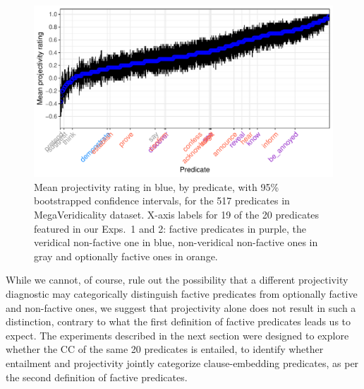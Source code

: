\documentclass[11pt,fleqn]{article}
\newcommand{\6}{\mbox{$[\hspace*{-.6mm}[$}}
\newcommand{\9}{\mbox{$]\hspace*{-.6mm}]$}}
\begin{document}
\begin{figure}[H]
\centering
\includegraphics[width=.75\paperwidth]{../white-rawlins-data/graphs/means-projection-by-predicate}

\caption{Mean projectivity rating in blue, by predicate, with 95\% bootstrapped confidence intervals, for the 517 predicates in MegaVeridicality dataset. X-axis labels for 19 of the 20 predicates featured in our Exps.~1 and 2: factive predicates in purple, the veridical non-factive one in blue, non-veridical non-factive ones in gray and optionally factive ones in orange.}
\label{f-white-rawlins-projectivity}
\end{figure}

While we cannot, of course, rule out the possibility that a different projectivity diagnostic may categorically distinguish factive predicates from optionally factive and non-factive ones, we suggest that projectivity alone does not result in such a distinction, contrary to what the first definition of factive predicates leads us to expect. The experiments described in the next section were designed to explore whether the CC of the same 20 predicates is entailed, to identify whether entailment and projectivity jointly categorize clause-embedding predicates, as per the second definition of factive predicates.
\end{document}
